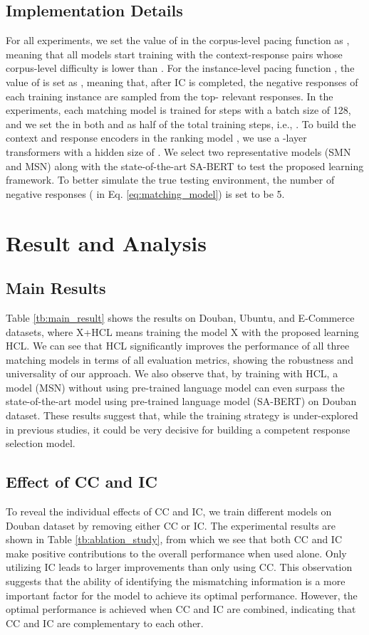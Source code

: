 \documentclass[11pt,a4paper]{article}
\begin{document}
\subsection{Implementation Details} 
For all experiments, we set the value of  in the corpus-level pacing function  as , meaning that all models start training with the context-response pairs whose corpus-level difficulty is lower than . For the instance-level pacing function , the value of  is set as , meaning that, after IC is completed, the negative responses of each training instance are sampled from the top- relevant responses. In the experiments, each matching model is trained for  steps with a batch size of 128, and we set the  in both  and  as half of the total training steps, i.e., . To build the context and response encoders in the ranking model , we use a -layer transformers with a hidden size of . We select two representative models (SMN and MSN) along with the state-of-the-art SA-BERT to test the proposed learning framework. To better simulate the true testing environment, the number of negative responses ( in Eq. \eqref{eq:matching_model}) is set to be 5.



\section{Result and Analysis}
\subsection{Main Results}
Table \ref{tb:main_result} shows the results on Douban, Ubuntu, and E-Commerce datasets, where X+HCL means training the model X with the proposed learning HCL. We can see that HCL significantly improves the performance of all three matching models in terms of all evaluation metrics, showing the robustness and universality of our approach. We also observe that, by training with HCL, a model (MSN) without using pre-trained language model can even surpass the state-of-the-art model using pre-trained language model (SA-BERT) on Douban dataset. These results suggest that, while the training strategy is under-explored in previous studies, it could be very decisive for building a competent response selection model.


\subsection{Effect of CC and IC} 
To reveal the individual effects of CC and IC, we train different models on Douban dataset by removing either CC or IC. The experimental results are shown in Table \ref{tb:ablation_study}, from which we see that both CC and IC make positive contributions to the overall performance when used alone. Only utilizing IC leads to larger improvements than only using CC. This observation suggests that the ability of identifying the mismatching information is a more important factor for the model to achieve its optimal performance. However, the optimal performance is achieved when CC and IC are combined, indicating that CC and IC are complementary to each other.
\end{document}
